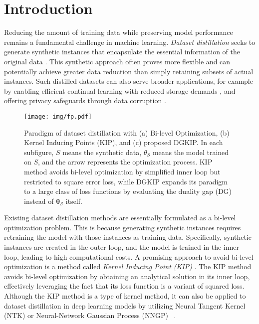 \section{Introduction}
\label{Introduction}

Reducing the amount of training data while preserving model performance remains a fundamental challenge in machine learning. \emph{Dataset distillation} seeks to generate synthetic instances that encapsulate the essential information of the original data \cite{yu2023dataset}. This synthetic approach often proves more flexible and can potentially achieve greater data reduction than simply retaining subsets of actual instances. Such distilled datasets can also serve broader applications, for example by enabling efficient continual learning with reduced storage demands \cite{masarczyk2020reducing, rosasco2021distilled, enneng2023efficient}, and offering privacy safeguards through data corruption \cite{dong2022privacy,liu2023backdoor}.


\begin{figure}[t]
\vskip 0.2in
\centering
\texttt{[image: img/fp.pdf]}
\caption{Paradigm of dataset distillation with (a) Bi-level Optimization, (b) Kernel Inducing Points (KIP), and (c) proposed DGKIP. In each subfigure, $S$ means the synthetic data, $\theta_S$ means the model trained on $S$, and the arrow represents the optimization process. KIP method avoids bi-level optimization by simplified inner loop but restricted to square error loss, while DGKIP expands its paradigm to a large class of loss functions by evaluating the duality gap (DG) instead of $\bm\theta_\mathcal{S}$ itself.}
\label{solutionspace}
\vskip -0.2in
\end{figure}

Existing dataset distillation methods are essentially formulated as a bi-level optimization problem. This is because generating synthetic instances requires retraining the model with those instances as training data. Specifically, synthetic instances are created in the outer loop, and the model is trained in the inner loop, leading to high computational costs. A promising approach to avoid bi-level optimization is a method called \emph{Kernel Inducing Point (KIP)} \cite{nguyen2020dataset}. The KIP method avoids bi-level optimization by obtaining an analytical solution in its inner loop, effectively leveraging the fact that its loss function is a variant of squared loss. Although the KIP method is a type of kernel method, it can also be applied to dataset distillation in deep learning models by utilizing Neural Tangent Kernel (NTK) \cite{novak2019neural} or Neural-Network Gaussian Process (NNGP) ~\cite{lee2017deep}.

